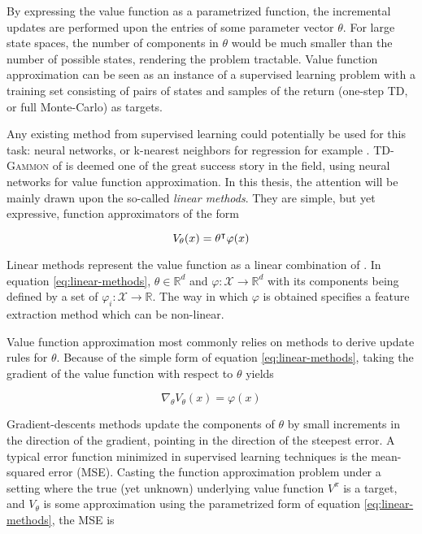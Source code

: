 By expressing the value function as a parametrized function, the incremental updates
are performed upon the entries of some parameter vector $\theta$. For
large state spaces, the number of components in $\theta$ would be much smaller than
the number of possible states, rendering the problem tractable. Value function
approximation can be seen as an instance of a supervised learning problem
with a training set consisting of pairs of states and samples of the return (one-step TD,
or full Monte-Carlo) as targets.

Any existing method from supervised learning could potentially be used for this task:
neural networks, or k-nearest neighbors for regression for example \parencite{Csaba2010}. \textsc{TD-Gammon} of \cite{Tesauro1995} is deemed  one of the great success story in the field, using neural networks for value function approximation. In this thesis, the attention
will be mainly drawn upon the so-called \textit{linear methods}. They are simple, but yet
expressive, function approximators of the form

\begin{equation}
V_{\theta}(x) = \theta^\intercal \varphi(x)
\label{eq:linear-methods}
\end{equation}

Linear methods represent the value function as a linear
combination of . In equation \ref{eq:linear-methods}, $\theta \in \mathbb{R}^d$ and $\varphi : \mathcal{X} \to \mathbb{R}^d$ with its components
being defined by a set of  $\varphi_i : \mathcal{X} \to
\mathbb{R}$. The way in which $\varphi$ is obtained specifies a feature extraction
method which can be non-linear.

Value function approximation most commonly relies on 
methods to derive update rules for $\theta$. Because of the simple form of equation \ref{eq:linear-methods}, taking the
gradient of the value function with respect to $\theta$ yields

\begin{equation}
\nabla_{\theta} V_\theta(x) = \varphi(x)
\label{eq:linear-gradient}
\end{equation}

Gradient-descents methods update the components of $\theta$ by small increments in the direction of
the gradient, pointing in the direction of the steepest error. A typical error function minimized in supervised
learning techniques is the mean-squared error (MSE). Casting the function
approximation problem under a setting where the true (yet unknown) underlying value
function $V^\pi$ is a target, and $V_\theta$ is some approximation using the
parametrized form of equation \ref{eq:linear-methods}, the MSE is 

